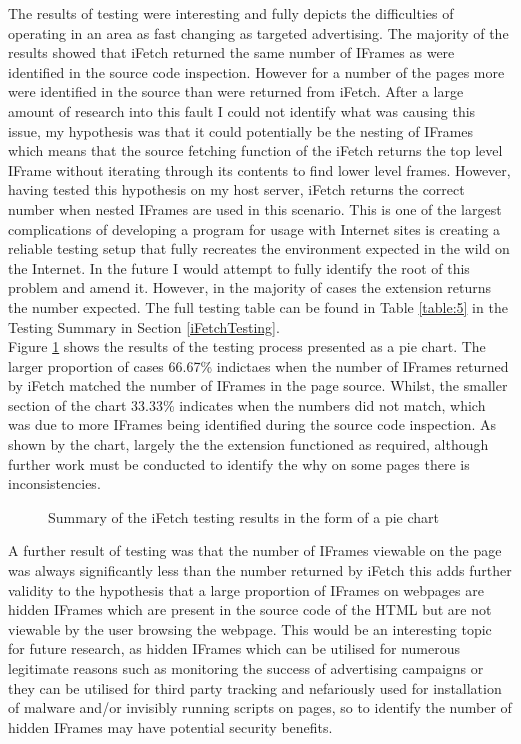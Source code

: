 \documentclass[12pt]{article}
\begin{document}
The results of testing were interesting and fully depicts the difficulties of operating in an area as fast changing as targeted advertising. The majority of the results showed that iFetch returned the same number of IFrames as were identified in the source code inspection. However for a number of the pages more were identified in the source than were returned from iFetch. After a large amount of research into this fault I could not identify what was causing this issue, my hypothesis was that it could potentially be the nesting of IFrames which means that the source fetching function of the iFetch returns the top level IFrame without iterating through its contents to find lower level frames. However, having tested this hypothesis on my host server, iFetch returns the correct number when nested IFrames are used in this scenario. This is one of the largest complications of developing a program for usage with Internet sites is creating a reliable testing setup that fully recreates the environment expected in the wild on the Internet. In the future I would attempt to fully identify the root of this problem and amend it. However, in the majority of cases the extension returns the number expected. The full testing table can be found in Table \ref{table:5} in the Testing Summary in Section \ref{iFetchTesting}. \\

Figure \ref{fig:ifPie} shows the results of the testing process presented as a pie chart. The larger proportion of cases 66.67\% indictaes when the number of IFrames returned by iFetch matched the number of IFrames in the page source. Whilst, the smaller section of the chart 33.33\% indicates when the numbers did not match, which was due to more IFrames being identified during the source code inspection. As shown by the chart, largely the the extension functioned as required, although further work must be conducted to identify the why on some pages there is inconsistencies.  

\begin{figure} [H]
    \centering
        \caption{Summary of the iFetch testing results in the form of a pie chart}
        \label{fig:ifPie}
\end{figure}

A further result of testing was that the number of IFrames viewable on the page was always significantly less than the number returned by iFetch this adds further validity to the hypothesis that a large proportion of IFrames on webpages are hidden IFrames which are present in the source code of the HTML but are not viewable by the user browsing the webpage. This would be an interesting topic for future research, as hidden IFrames which can be utilised for numerous legitimate reasons such as monitoring the success of advertising campaigns or they can be utilised for third party tracking and nefariously used for installation of malware and/or invisibly running scripts on pages, so to identify the number of hidden IFrames may have potential security benefits. 
\end{document}
